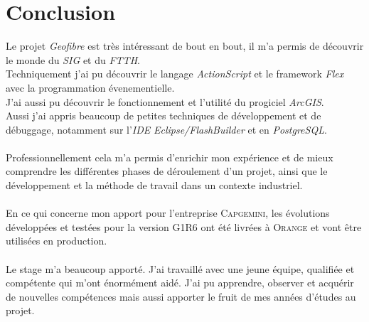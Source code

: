\chapter*{Conclusion}

Le projet \textit{Geofibre} est très intéressant de bout en bout, il m'a permis de découvrir le monde du \textit{SIG} et du \textit{FTTH}.
\\Techniquement j'ai pu découvrir le langage \textit{ActionScript} et le framework \textit{Flex} avec la programmation évenementielle.
 \\ J'ai aussi pu découvrir le fonctionnement et l'utilité du progiciel \textit{ArcGIS}.
 \\Aussi j'ai appris beaucoup de petites techniques de développement et de débuggage, notamment sur l'\textit{IDE} \textit{Eclipse/FlashBuilder} et en \textit{PostgreSQL}.
\\\\Professionnellement cela m'a permis d'enrichir mon expérience et de mieux comprendre les différentes phases de déroulement d'un projet, ainsi que le développement et la méthode de travail dans un contexte industriel.
\\\\En ce qui concerne mon apport pour l'entreprise \textsc{Capgemini}, les évolutions développées et testées pour la version G1R6 ont été livrées à \textsc{Orange} et vont être utilisées en production.
\\\\Le stage m'a beaucoup apporté. J'ai travaillé avec une jeune équipe, qualifiée et compétente qui m'ont énormément aidé. J'ai pu apprendre, observer et acquérir de nouvelles compétences mais aussi apporter le fruit de mes années d'études au projet.

